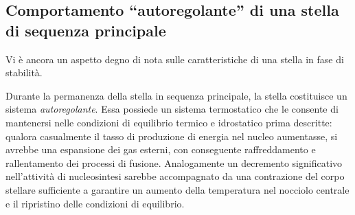 \subsection{Comportamento ``autoregolante'' di una stella di sequenza principale}
Vi è ancora un aspetto degno di nota sulle caratteristiche di una stella in fase di stabilit\`{a}.
\par
Durante la permanenza della stella in sequenza principale, la stella costituisce un sistema \emph{autoregolante}. Essa possiede un sistema termostatico che le consente di mantenersi nelle condizioni di equilibrio termico e idrostatico prima descritte: qualora casualmente il tasso di produzione di energia nel nucleo aumentasse, si avrebbe una espansione dei gas esterni, con conseguente raffreddamento e rallentamento dei processi di fusione. 
Analogamente un decremento significativo nell'attivit\`{a} di nucleosintesi sarebbe accompagnato da una contrazione del corpo stellare sufficiente a garantire un aumento della temperatura nel nocciolo centrale e il ripristino delle condizioni di equilibrio.
